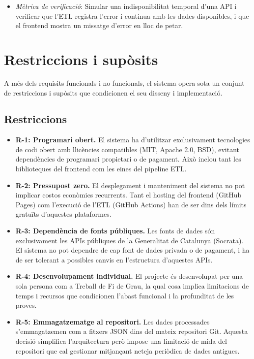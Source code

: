 \begin{itemize}
    \item \textit{Mètrica de verificació}: Simular una indisponibilitat temporal d'una API i verificar que l'ETL registra l'error i continua amb les dades disponibles, i que el frontend mostra un missatge d'error en lloc de petar.
\end{itemize}


\section{Restriccions i supòsits}

A més dels requisits funcionals i no funcionals, el sistema opera sota un conjunt de restriccions i supòsits que condicionen el seu disseny i implementació.

\subsection{Restriccions}

\begin{itemize}
    \item \textbf{R-1: Programari obert.} El sistema ha d'utilitzar exclusivament tecnologies de codi obert amb llicències compatibles (MIT, Apache 2.0, BSD), evitant dependències de programari propietari o de pagament. Això inclou tant les biblioteques del frontend com les eines del pipeline ETL.

    \item \textbf{R-2: Pressupost zero.} El desplegament i manteniment del sistema no pot implicar costos econòmics recurrents. Tant el hosting del frontend (GitHub Pages) com l'execució de l'ETL (GitHub Actions) han de ser dins dels límits gratuïts d'aquestes plataformes.

    \item \textbf{R-3: Dependència de fonts públiques.} Les fonts de dades són exclusivament les APIs públiques de la Generalitat de Catalunya (Socrata). El sistema no pot dependre de cap font de dades privada o de pagament, i ha de ser tolerant a possibles canvis en l'estructura d'aquestes APIs.

    \item \textbf{R-4: Desenvolupament individual.} El projecte és desenvolupat per una sola persona com a Treball de Fi de Grau, la qual cosa implica limitacions de temps i recursos que condicionen l'abast funcional i la profunditat de les proves.

    \item \textbf{R-5: Emmagatzematge al repositori.} Les dades processades s'emmagatzemen com a fitxers JSON dins del mateix repositori Git. Aquesta decisió simplifica l'arquitectura però impose una limitació de mida del repositori que cal gestionar mitjançant neteja periòdica de dades antigues.
\end{itemize}

